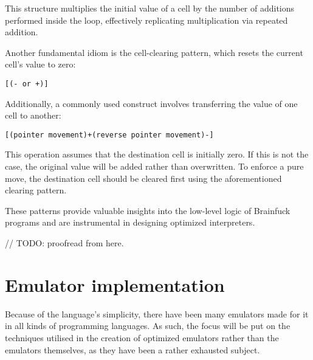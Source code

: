 \par This structure multiplies the initial value of a cell by the number of additions performed inside the loop, effectively replicating multiplication via repeated addition.

\par Another fundamental idiom is the cell-clearing pattern, which resets the current cell's value to zero:

\begin{verbatim}
[(- or +)]
\end{verbatim}

\par Additionally, a commonly used construct involves transferring the value of one cell to another:

\begin{verbatim}
[(pointer movement)+(reverse pointer movement)-]
\end{verbatim}

\par This operation assumes that the destination cell is initially zero. If this is not the case, the original value will be added rather than overwritten. To enforce a pure move, the destination cell should be cleared first using the aforementioned clearing pattern.

\par These patterns provide valuable insights into the low-level logic of Brainfuck programs and are instrumental in designing optimized interpreters.

\clearpage

// TODO: proofread from here.

\section{Emulator implementation}
\label{sec:ch2sec2}

\par Because of the language's simplicity, there have been many emulators made for it in all kinds of programming languages. As such, the focus will be put on the techniques utilised in the creation of optimized emulators rather than the emulators themselves, as they have been a rather exhausted subject.

